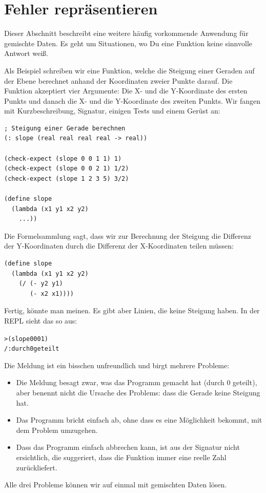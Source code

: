 \section{Fehler repräsentieren}

Dieser Abschnitt beschreibt eine weitere häufig vorkommende Anwendung
für gemischte Daten.  Es geht um Situationen, wo Du eine Funktion
keine sinnvolle Antwort weiß.

Als Beispiel schreiben wir eine Funktion, welche die Steigung einer
Geraden auf der Ebene berechnet anhand der Koordinaten zweier Punkte
darauf.  Die Funktion akzeptiert vier Argumente: Die X- und die Y-Koordinate des
ersten Punkts und danach die X- und die Y-Koordinate des zweiten
Punkts.  Wir fangen mit Kurzbeschreibung, Signatur, einigen Tests
und einem Gerüst an:
%
\begin{lstlisting}
; Steigung einer Gerade berechnen
(: slope (real real real real -> real))

(check-expect (slope 0 0 1 1) 1)
(check-expect (slope 0 0 2 1) 1/2)
(check-expect (slope 1 2 3 5) 3/2)

(define slope
  (lambda (x1 y1 x2 y2)
    ...))
\end{lstlisting}
%
Die Formelsammlung sagt, dass wir zur Berechnung der Steigung die
Differenz der Y-Koordinaten durch die Differenz der X-Koordinaten
teilen müssen:
%
\begin{lstlisting}
(define slope
  (lambda (x1 y1 x2 y2)
    (/ (- y2 y1)
       (- x2 x1))))
\end{lstlisting}
%
Fertig, könnte man meinen.  Es gibt aber Linien, die keine Steigung
haben.  In der REPL sieht das so aus:
%
\begin{alltt}
> (slope 0 0 0 1)
{\color{red}/: durch 0 geteilt}
\end{alltt}
%
Die Meldung ist ein bisschen unfreundlich und birgt mehrere Probleme:
%
\begin{itemize}
\item Die Meldung besagt zwar, was das Programm gemacht hat (durch 0
  geteilt), aber benennt nicht die Ursache des Problems: dass die
  Gerade keine Steigung hat.
\item Das Programm bricht einfach ab, ohne dass es eine Möglichkeit
  bekommt, mit dem Problem umzugehen.
\item Dass das Programm einfach abbrechen kann, ist aus der Signatur
  nicht ersichtlich, die suggeriert, dass die Funktion immer eine
  reelle Zahl zurückliefert.
\end{itemize}
%
Alle drei Probleme können wir auf einmal mit gemischten Daten lösen.
